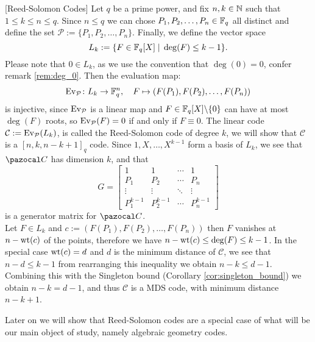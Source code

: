 \begin{example}\label{exmp:rs_codes}[Reed-Solomon Codes]
  Let $q$ be a prime power, and fix $n, k \in \mathbb{N}$ such that $1 \leq k \leq n \leq q$. Since $n \leq q$ we can chose $P_{1}, P_{2}, \ldots, P_{n} \in \mathbb{F}_{q}$ all distinct and define the set $\mathcal{P} := \{P_{1}, P_{2}, \ldots, P_{n}\}$. Finally, we define the vector space
  \begin{equation*}
    L_{k} := \{F \in \mathbb{F}_{q}[X] \;\vert\; \deg(F) \leq k - 1\}.
  \end{equation*}
  Please note that $0 \in L_{k}$, as we use the convention that $\deg(0) = 0$, confer remark \ref{rem:deg_0}.
  Then the evaluation map:
  \begin{align*}
    \textnormal{Ev}_\mathcal{P}\colon L_{k} \to \mathbb{F}_{q}^{n}, \quad F \mapsto (F(P_{1}), F(P_{2}), \ldots, F(P_{n}))
  \end{align*}
  is injective, since $\textnormal{Ev}_\mathcal{P}$ is a linear map and $F \in \mathbb{F}_{q}[X] \backslash \{0\}$ can have at most $\deg(F)$ roots, so $\textnormal{Ev}_\mathcal{P}(F) = 0$ if and only if $F \equiv 0$. The linear code $\mathcal{C} := \textnormal{Ev}_\mathcal{P}(L_{k})$, is called the Reed-Solomon code of degree $k$, we will show that $\mathcal{C}$ is a $[n, k, n - k + 1]_{q}$ code.
  Since $1, X, \ldots, X^{k - 1}$ form a basis of $L_{k}$, we see that $\C$ has dimension $k$, and that
  \begin{equation*}
    G = \begin{bmatrix}
          1 & 1 & \cdots & 1\\
          P_{1} & P_{2} & \cdots & P_{n} \\
          \vdots & \vdots & \ddots & \vdots \\
          P_{1}^{k - 1} & P_{2}^{k - 1} & \cdots & P_{n}^{k -  1}
    \end{bmatrix}
  \end{equation*}
  is a generator matrix for $\C$. \\
  Let $F \in L_{k}$ and $c := (F(P_1), F(P_2), \ldots, F(P_{n}))$ then $F$ vanishes at $n - \mathrm{wt}(c)$ of the points, therefore we have $n - \mathrm{wt}(c) \leq \deg(F) \leq k - 1$.
  In the special case $\mathrm{wt}(c) = d$ and $d$ is the minimum distance of $\mathcal{C}$, we see that $n - d \leq k - 1$ from rearranging this inequality we obtain $n - k \leq d - 1$. Combining this with the Singleton bound (Corollary \ref{cor:singleton_bound}) we obtain $n - k = d - 1$, and thus $\mathcal{C}$ is a MDS code, with minimum distance $n - k + 1$.
\end{example}
Later on we will show that Reed-Solomon codes are a special case of what will be our main object of study, namely algebraic geometry codes.


